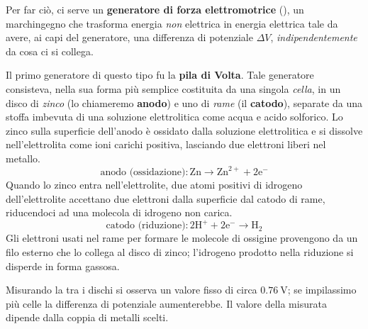 Per far ciò, ci serve un \textbf{generatore di forza elettromotrice} (\fem), un marchingegno che trasforma energia \textit{non} elettrica in energia elettrica tale da avere, ai capi del generatore, una differenza di potenziale $\Delta V$, \textit{indipendentemente} da cosa ci si collega.
\begin{digressionwt}
	Il primo generatore di questo tipo fu la \textbf{pila di Volta}. Tale generatore consisteva, nella sua forma più semplice costituita da una singola \textit{cella}, in un disco di \textit{zinco} (lo chiameremo \textbf{anodo}) e uno di \textit{rame} (il \textbf{catodo}), separate da una stoffa imbevuta di una soluzione elettrolitica come acqua e acido solforico.
	Lo zinco sulla superficie dell'anodo è ossidato dalla soluzione elettrolitica e si dissolve nell'elettrolita come ioni carichi positiva, lasciando due elettroni liberi nel metallo.
	\begin{equation*}
		\text{anodo (ossidazione)}\colon \mathrm{Zn}\to\mathrm{Zn}^{2+}+2\mathrm{e}^{-}
	\end{equation*}
	Quando lo zinco entra nell'elettrolite, due atomi positivi di idrogeno dell'elettrolite accettano due elettroni dalla superficie dal catodo di rame, riducendoci ad una molecola di idrogeno non carica.
	\begin{equation*}
		\text{catodo (riduzione)}\colon2\mathrm{H}^{+}+2\mathrm{e}^{-}\to\mathrm{H}_2
	\end{equation*}
	Gli elettroni usati nel rame per formare le molecole di ossigine provengono da un filo esterno che lo collega al disco di zinco; l'idrogeno prodotto nella riduzione si disperde in forma gassosa.

	Misurando la \ddp tra i dischi si osserva un valore fisso di circa $\SI{0,76}{\volt}$; se impilassimo più celle la differenza di potenziale aumenterebbe. Il valore della  \ddp misurata dipende dalla coppia di metalli scelti.
\end{digressionwt}
